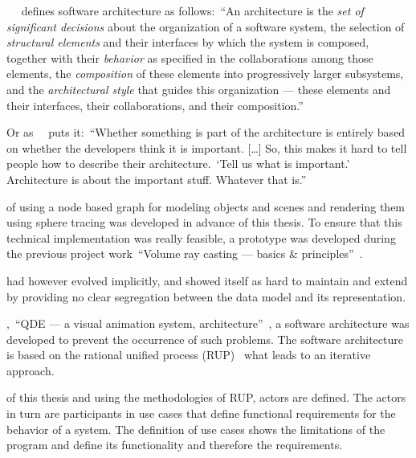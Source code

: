 \documentclass[%
    a4paper,    %
    justified,  %
    nobib,      %
    openany     %
]{tufte-book}
\begin{document}
~~\cite{kruchten_rup_2003} defines
software architecture as follows:~\enquote{An architecture is the \textit{set of
significant decisions} about the organization of a software system, the
selection of \textit{structural elements} and their interfaces by which the
system is composed, together with their \textit{behavior} as specified in the
collaborations among those elements, the \textit{composition} of these elements
into progressively larger subsystems, and the \textit{architectural style} that
guides this organization --- these elements and their interfaces, their
collaborations, and their composition.}

Or as~~\cite{fowler_architect_2003} puts
it:~\enquote{Whether something is part of the architecture is entirely based on
whether the developers think it is important. [\ldots] So, this makes it hard to
tell people how to describe their architecture.~\enquote{Tell us what is
important.} Architecture is about the important stuff. Whatever that
is.}

 of using a node based graph for
modeling objects and scenes and rendering them using sphere tracing was
developed in advance of this thesis. To ensure that this technical
implementation was really feasible, a prototype was developed during the
previous project work~\enquote{Volume ray casting --- basics \&
principles}~\cite{osterwalder-volume-2016}.

 had however evolved implicitly,
and showed itself as hard to maintain and extend by providing no clear
segregation between the data model and its representation.

,~\enquote{QDE --- a visual animation
system, architecture}~\cite{osterwalder-qde-2016}, a software architecture was
developed to prevent the occurrence of such problems. The software architecture
is based on the rational unified process (RUP)~\cite{kruchten_rup_2003} what
leads to an iterative approach.

 of this thesis and using the methodologies of
RUP, actors are defined. The actors in turn are participants in use cases that
define functional requirements for the behavior of a system. The definition of
use cases shows the limitations of the program and define its functionality and
therefore the requirements.
\end{document}
